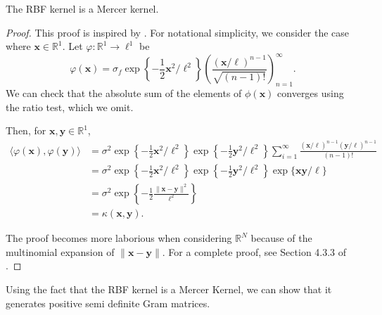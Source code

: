 \begin{theorem}
    The RBF kernel is a Mercer kernel.
\end{theorem}
\begin{proof}
    This proof is inspired by \cite{shashua2009}.
    For notational simplicity, we consider the case where $\mathbf{x} \in \mathbb{R}^{1}$.
    Let $\varphi: \mathbb{R}^{1} \to \ell^{1}$ be
    \begin{equation*}
        \varphi(\mathbf{x}) = \sigma_f \exp\left\{-\frac12 \mathbf{x}^2 / \ell^2\right\} \left(\frac{ (\mathbf{x} / \ell)^{n - 1} }{ \sqrt{(n - 1)!} }\right)_{n=1}^{\infty}.
    \end{equation*}
    We can check that the absolute sum of the elements of $\phi(\mathbf{x})$ converges using the ratio test, which we omit.

    Then, for $\mathbf{x}, \mathbf{y} \in \mathbb{R}^{1}$,
    \begin{align*}
        \langle \varphi(\mathbf{x}), \varphi(\mathbf{y}) \rangle
        & = \sigma^2
        \exp \left\{ -\frac12 \mathbf{x}^2 / \ell^2 \right\}
        \exp \left\{ -\frac12 \mathbf{y}^2 / \ell^2 \right\}
        \sum\limits_{i=1}^{\infty}
        \frac{ (\mathbf{x} / \ell)^{n - 1} (\mathbf{y} / \ell)^{n - 1}}{ (n - 1)! } \\
        & = \sigma^2
        \exp \left\{ -\frac12 \mathbf{x}^2 / \ell^2 \right\}
        \exp \left\{ -\frac12 \mathbf{y}^2 / \ell^2 \right\}
        \exp \{ \mathbf{x} \mathbf{y} / \ell \} \\
        & = \sigma^2 \exp \left\{ -\frac12 \frac{ \lVert \mathbf{x} - \mathbf{y} \rVert^2 }{ \ell^2 } \right\} \\
        & = \kappa(\mathbf{x}, \mathbf{y}).
    \end{align*}

    The proof becomes more laborious when considering $\mathbb{R}^{N}$ because of the multinomial expansion of $\lVert \mathbf{x} - \mathbf{y} \rVert$.
    For a complete proof, see Section 4.3.3 of \cite{shashua2009}.
\end{proof}

Using the fact that the RBF kernel is a Mercer Kernel, we can show that it generates positive semi definite Gram matrices.

